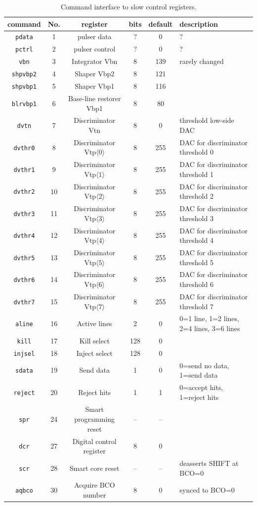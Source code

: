 \documentclass[11pt]{article}
\begin{document}
\begin{table}
\begin{center}
\begin{tabular}{|c|c|c|c|c|l|} \hline
command & No. & register & bits & default & description \\ \hline
{\tt pdata} & 1 & pulser data & ? & 0 & ? \\
{\tt pctrl} & 2 & pulser control & ? & 0 & ? \\
{\tt vbn} & 3 & Integrator Vbn & 8 & 139 & rarely changed \\
{\tt shpvbp2} & 4 & Shaper Vbp2 & 8 & 121 &  \\
{\tt shpvbp1} & 5 & Shaper Vbp1 & 8 & 116 &  \\
{\tt blrvbp1} & 6 & Base-line restorer Vbp1 & 8 & 80 & \\
{\tt dvtn} & 7 & Discriminator Vtn & 8 & 0 & threshold low-side DAC \\
{\tt dvthr0} & 8 & Discriminator Vtp$\langle 0\rangle$ & 8 & 255 & DAC for discriminator threshold 0 \\
{\tt dvthr1} & 9 & Discriminator Vtp$\langle 1\rangle$ & 8 & 255 & DAC for discriminator threshold 1 \\
{\tt dvthr2} & 10 & Discriminator Vtp$\langle 2\rangle$ & 8 & 255 & DAC for discriminator threshold 2 \\
{\tt dvthr3} & 11 & Discriminator Vtp$\langle 3\rangle$ & 8 & 255 & DAC for discriminator threshold 3 \\
{\tt dvthr4} & 12 & Discriminator Vtp$\langle 4\rangle$ & 8 & 255 & DAC for discriminator threshold 4 \\
{\tt dvthr5} & 13 & Discriminator Vtp$\langle 5\rangle$ & 8 & 255 & DAC for discriminator threshold 5 \\
{\tt dvthr6} & 14 & Discriminator Vtp$\langle 6\rangle$ & 8 & 255 & DAC for discriminator threshold 6 \\
{\tt dvthr7} & 15 & Discriminator Vtp$\langle 7\rangle$ & 8 & 255 & DAC for discriminator threshold 7 \\
{\tt aline} & 16 & Active lines & 2 & 0 & 0=1 line, 1=2 lines, 2=4 lines, 3=6 lines \\
{\tt kill} & 17 & Kill select & 128 & 0 & \\
{\tt injsel} & 18 & Inject select & 128 & 0 & \\
{\tt sdata} & 19 & Send data & 1 & 0 & 0=send no data, 1=send data \\
{\tt reject} & 20 & Reject hits & 1 & 1 & 0=accept hits, 1=reject hits \\
{\tt spr} & 24 & Smart programming reset & -- & -- & \\
{\tt dcr} & 27 & Digital control register & 8 & 0 & \\
{\tt scr} & 28 & Smart core reset & -- & -- & deasserts SHIFT at BCO=0 \\
{\tt aqbco} & 30 & Acquire BCO number & 8 & 0 & synced to BCO=0 \\ \hline
\end{tabular}
\caption{\label{tab-sc}Command interface to slow control registers.}
\end{center}
\end{table}
\end{document}
